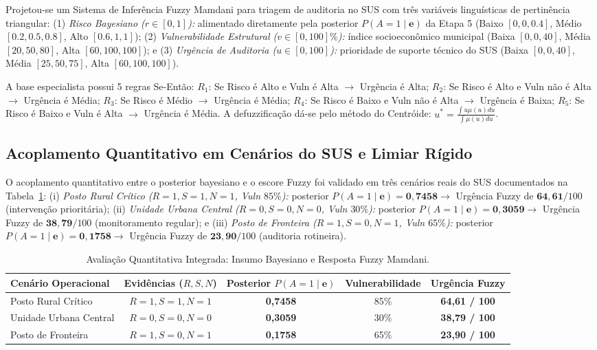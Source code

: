 \documentclass[12pt]{article}
\begin{document}
Projetou-se um Sistema de Inferência Fuzzy Mamdani \cite{mamdani1975,zadeh1965} para triagem de auditoria no SUS com três variáveis linguísticas de pertinência triangular:
(1) \textit{Risco Bayesiano ($r \in [0, 1]$):} alimentado diretamente pela posterior $P(A=1 \mid \mathbf{e})$ da Etapa 5 (Baixo $[0, 0, 0.4]$, Médio $[0.2, 0.5, 0.8]$, Alto $[0.6, 1, 1]$);
(2) \textit{Vulnerabilidade Estrutural ($v \in [0, 100]\%$):} índice socioeconômico municipal (Baixa $[0, 0, 40]$, Média $[20, 50, 80]$, Alta $[60, 100, 100]$); e
(3) \textit{Urgência de Auditoria ($u \in [0, 100]$):} prioridade de suporte técnico do SUS (Baixa $[0, 0, 40]$, Média $[25, 50, 75]$, Alta $[60, 100, 100]$).

A base especialista possui 5 regras Se-Então: $R_1$: Se Risco é Alto e Vuln é Alta $\to$ Urgência é Alta; $R_2$: Se Risco é Alto e Vuln não é Alta $\to$ Urgência é Média; $R_3$: Se Risco é Médio $\to$ Urgência é Média; $R_4$: Se Risco é Baixo e Vuln não é Alta $\to$ Urgência é Baixa; $R_5$: Se Risco é Baixo e Vuln é Alta $\to$ Urgência é Média. A defuzzificação dá-se pelo método do Centróide: $u^* = \frac{\int u \mu(u) du}{\int \mu(u) du}$.

\subsection{Acoplamento Quantitativo em Cenários do SUS e Limiar Rígido}

O acoplamento quantitativo entre o posterior bayesiano e o escore Fuzzy foi validado em três cenários reais do SUS documentados na Tabela~\ref{tab:cenarios}:
(i) \textit{Posto Rural Crítico ($R=1, S=1, N=1$, Vuln $85\%$):} posterior $P(A=1 \mid \mathbf{e}) = \mathbf{0,7458} \to$ Urgência Fuzzy de $\mathbf{64,61} / 100$ (intervenção prioritária);
(ii) \textit{Unidade Urbana Central ($R=0, S=0, N=0$, Vuln $30\%$):} posterior $P(A=1 \mid \mathbf{e}) = \mathbf{0,3059} \to$ Urgência Fuzzy de $\mathbf{38,79} / 100$ (monitoramento regular); e
(iii) \textit{Posto de Fronteira ($R=1, S=0, N=1$, Vuln $65\%$):} posterior $P(A=1 \mid \mathbf{e}) = \mathbf{0,1758} \to$ Urgência Fuzzy de $\mathbf{23,90} / 100$ (auditoria rotineira).

\begin{table}[htbp]
\centering
\footnotesize
\caption{Avaliação Quantitativa Integrada: Insumo Bayesiano e Resposta Fuzzy Mamdani.}
\label{tab:cenarios}
\begin{tabular}{lcccc}
\toprule
\textbf{Cenário Operacional} & \textbf{Evidências ($R, S, N$)} & \textbf{Posterior $P(A=1 \mid \mathbf{e})$} & \textbf{Vulnerabilidade} & \textbf{Urgência Fuzzy} \\
\midrule
Posto Rural Crítico & $R=1, S=1, N=1$ & \textbf{0,7458} & 85\% & \textbf{64,61 / 100} \\
Unidade Urbana Central & $R=0, S=0, N=0$ & \textbf{0,3059} & 30\% & \textbf{38,79 / 100} \\
Posto de Fronteira & $R=1, S=0, N=1$ & \textbf{0,1758} & 65\% & \textbf{23,90 / 100} \\
\bottomrule
\end{tabular}
\end{table}
\end{document}
